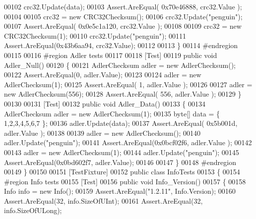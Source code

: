 \begin{DoxyCode}
00102             crc32.Update(data);
00103             Assert.AreEqual( 0x70e46888, crc32.Value  );
00104 
00105             crc32 = \textcolor{keyword}{new} CRC32Checksum();
00106             crc32.Update(\textcolor{stringliteral}{"penguin"});
00107             Assert.AreEqual( 0x0e5c1a120, crc32.Value );
00108 
00109             crc32 = \textcolor{keyword}{new} CRC32Checksum(1);
00110             crc32.Update(\textcolor{stringliteral}{"penguin"});
00111             Assert.AreEqual(0x43b6aa94, crc32.Value);
00112 
00113         \}
00114 \textcolor{preprocessor}{        #endregion}
00115 
00116 \textcolor{preprocessor}{        #region Adler tests}
00117 
00118         [Test]
00119         \textcolor{keyword}{public} \textcolor{keywordtype}{void} Adler\_Null()
00120         \{
00121             AdlerChecksum adler = \textcolor{keyword}{new} AdlerChecksum();
00122             Assert.AreEqual(0, adler.Value);
00123 
00124             adler = \textcolor{keyword}{new} AdlerChecksum(1);
00125             Assert.AreEqual( 1, adler.Value );
00126 
00127             adler = \textcolor{keyword}{new} AdlerChecksum(556);
00128             Assert.AreEqual( 556, adler.Value );
00129         \}
00130 
00131         [Test]
00132         \textcolor{keyword}{public} \textcolor{keywordtype}{void} Adler\_Data()
00133         \{
00134             AdlerChecksum adler = \textcolor{keyword}{new} AdlerChecksum(1);
00135             byte[] data = \{ 1,2,3,4,5,6,7 \};
00136             adler.Update(data);
00137             Assert.AreEqual( 0x5b001d, adler.Value  );
00138 
00139             adler = \textcolor{keyword}{new} AdlerChecksum();
00140             adler.Update(\textcolor{stringliteral}{"penguin"});
00141             Assert.AreEqual(0x0bcf02f6, adler.Value );
00142 
00143             adler = \textcolor{keyword}{new} AdlerChecksum(1);
00144             adler.Update(\textcolor{stringliteral}{"penguin"});
00145             Assert.AreEqual(0x0bd602f7, adler.Value);
00146 
00147         \}
00148 \textcolor{preprocessor}{        #endregion}
00149     \}
00150 
00151     [TestFixture]
00152     \textcolor{keyword}{public} \textcolor{keyword}{class }InfoTests
00153     \{
00154 \textcolor{preprocessor}{        #region Info tests}
00155         [Test]
00156         \textcolor{keyword}{public} \textcolor{keywordtype}{void} Info\_Version()
00157         \{
00158             Info info = \textcolor{keyword}{new} Info();
00159             Assert.AreEqual(\textcolor{stringliteral}{"1.2.11"}, Info.Version);
00160             Assert.AreEqual(32, info.SizeOfUInt);
00161             Assert.AreEqual(32, info.SizeOfULong);

\end{DoxyCode}

